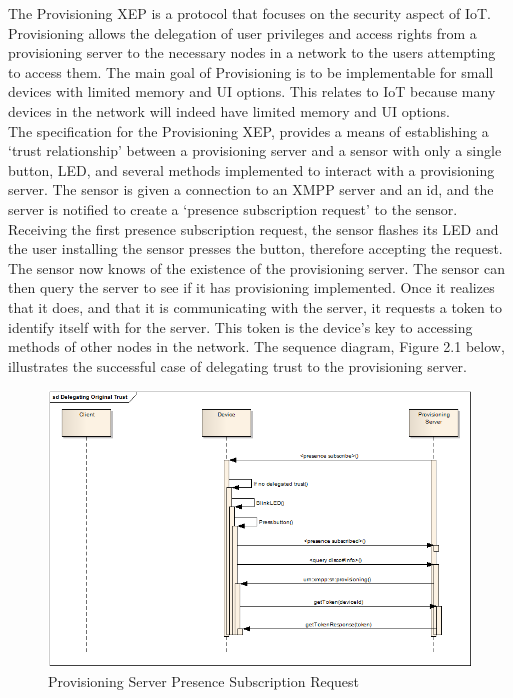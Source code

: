 The Provisioning XEP is a protocol that focuses on the security aspect of IoT. Provisioning allows the delegation of user privileges and access rights from a provisioning server to the necessary nodes in a network to the users attempting to access them. The main goal of Provisioning is to be implementable for small devices with limited memory and UI options. This relates to IoT because many devices in the network will indeed have limited memory and UI options. \\
The specification for the Provisioning XEP, provides a means of establishing a `trust relationship' between a provisioning server and a sensor with only a single button, LED, and several methods implemented to interact with a provisioning server. The sensor is given a connection to an XMPP server and an id, and the server is notified to create a `presence subscription request' to the sensor. Receiving the first presence subscription request, the sensor flashes its LED and the user installing the sensor presses the button, therefore accepting the request. The sensor now knows of the existence of the provisioning server. The sensor can then query the server to see if it has provisioning implemented. Once it realizes that it does, and that it is communicating with the server, it requests a token to identify itself with for the server. This token is the device's key to accessing methods of other nodes in the network. The sequence diagram, Figure 2.1 below, illustrates the successful case of delegating trust to the provisioning server. \\
\begin{figure}
\centering
\includegraphics[scale=.5]{images/delegatingTrustSimpleNode}
\caption{Provisioning Server Presence Subscription Request}
\end{figure}
